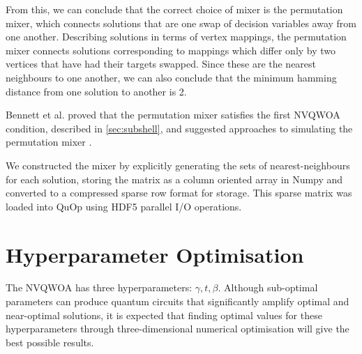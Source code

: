 From this, we can conclude that the correct choice of mixer is the permutation mixer, which connects solutions that are one swap of decision variables away from one another. Describing solutions in terms of vertex mappings, the permutation mixer connects solutions corresponding to mappings which differ only by two vertices that have had their targets swapped. Since these are the nearest neighbours to one another, we can also conclude that the minimum hamming distance from one solution to another is 2.

Bennett et al. proved that the permutation mixer satisfies the first NVQWOA condition, described in \ref{sec:subshell}, and suggested approaches to simulating the permutation mixer \cite{bennett2024analysisnonvariationalquantumwalkbased}.

We constructed the mixer by explicitly generating the sets of nearest-neighbours for each solution, storing the matrix as a column oriented array in Numpy \cite{numpy} and converted to a compressed sparse row format for storage. This sparse matrix was loaded into QuOp using HDF5 parallel I/O operations\cite{hdf5}.

\section{Hyperparameter Optimisation} \label{sec:parameters}
The NVQWOA has three hyperparameters: $\gamma, t, \beta$. Although sub-optimal parameters can produce quantum circuits that significantly amplify optimal and near-optimal solutions, it is expected that finding optimal values for these hyperparameters through three-dimensional numerical optimisation will give the best possible results.\cite{bennett2024analysisnonvariationalquantumwalkbased}
 
